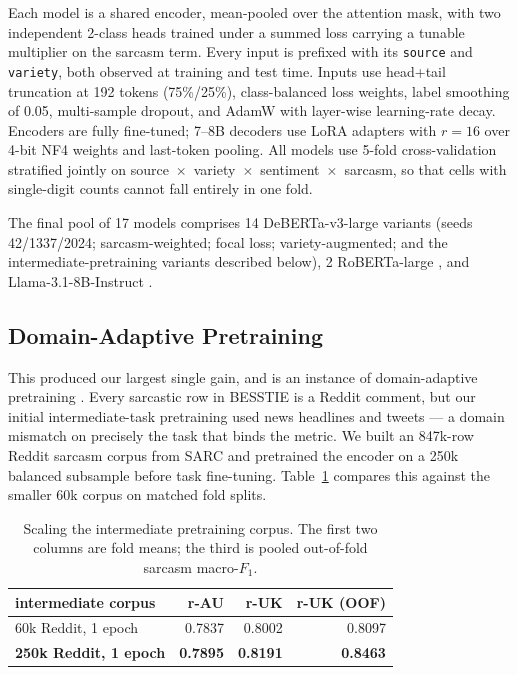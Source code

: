 \documentclass[11pt]{article}
\begin{document}
Each model is a shared encoder, mean-pooled over the attention mask, with two
independent 2-class heads trained under a summed loss carrying a tunable
multiplier on the sarcasm term. Every input is prefixed with its
\texttt{source} and \texttt{variety}, both observed at training and test time.
Inputs use head+tail truncation at 192 tokens (75\%/25\%), class-balanced loss
weights, label smoothing of 0.05, multi-sample dropout, and AdamW with
layer-wise learning-rate decay. Encoders are fully fine-tuned; 7--8B decoders
use LoRA adapters \citep{hu2022lora} with $r{=}16$ over 4-bit NF4 weights
\citep{dettmers2023qlora} and last-token pooling. All models use 5-fold
cross-validation stratified jointly on
source~$\times$~variety~$\times$~sentiment~$\times$~sarcasm, so that cells with
single-digit counts cannot fall entirely in one fold.

The final pool of 17 models comprises 14 DeBERTa-v3-large
\citep{he2021deberta} variants (seeds 42/1337/2024; sarcasm-weighted; focal
loss; variety-augmented; and the intermediate-pretraining variants described
below), 2 RoBERTa-large \citep{liu2019roberta}, and Llama-3.1-8B-Instruct
\citep{llama3}.

\subsection{Domain-Adaptive Pretraining}
\label{sec:dapt}

This produced our largest single gain, and is an instance of domain-adaptive
pretraining \citep{gururangan2020}. Every sarcastic row in BESSTIE is a Reddit
comment, but our initial intermediate-task pretraining used news headlines and
tweets --- a domain mismatch on precisely the task that binds the metric. We
built an 847k-row Reddit sarcasm corpus from SARC \citep{khodak2018sarc} and
pretrained the encoder on a 250k balanced subsample before task fine-tuning.
Table~\ref{tab:tapt} compares this against the smaller 60k corpus on matched
fold splits.

\begin{table}[t]
\centering\footnotesize
\begin{tabular}{lrrr}
\toprule
intermediate corpus & r-AU & r-UK & r-UK (OOF) \\
\midrule
60k Reddit, 1 epoch & 0.7837 & 0.8002 & 0.8097 \\
\textbf{250k Reddit, 1 epoch} & \textbf{0.7895} & \textbf{0.8191} & \textbf{0.8463} \\
\bottomrule
\end{tabular}
\caption{Scaling the intermediate pretraining corpus. The first two columns
are fold means; the third is pooled out-of-fold sarcasm macro-$F_1$.}
\label{tab:tapt}
\end{table}
\end{document}
